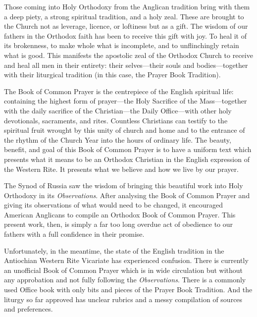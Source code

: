 {}
\noindent
Those coming into Holy Orthodoxy from the Anglican tradition bring with them a deep piety, a strong spiritual tradition, and a holy zeal. These are brought to the Church not as leverage, licence, or loftiness but as a gift. The wisdom of our fathers in the Orthodox faith has been to receive this gift with joy. To heal it of its brokenness, to make whole what is incomplete, and to unflinchingly retain what is good. This manifests the apostolic zeal of the Orthodox Church to receive and heal all men in their entirety: their selves---their souls and bodies---together with their liturgical tradition (in this case, the Prayer Book Tradition).\par
{}\par\noindent
The Book of Common Prayer is the centrepiece of the English spiritual life: containing the highest form of prayer---the Holy Sacrifice of the Mass---together with the daily sacrifice of the Christian---the Daily Office---with other holy devotionals, sacraments, and rites. Countless Christians can testify to the spiritual fruit wrought by this unity of church and home and to the entrance of the rhythm of the Church Year into the hours of ordinary life. The beauty, benefit, and goal of this Book of Common Prayer is to have a uniform text which presents what it means to be an Orthodox Christian in the English expression of the Western Rite. It presents what we believe and how we live by our prayer.\par
The Synod of Russia saw the wisdom of bringing this beautiful work into Holy Orthodoxy in its \textit{Observations}. After analysing the Book of Common Prayer and giving its observations of what would need to be changed, it encouraged American Anglicans to compile an Orthodox Book of Common Prayer. This present work, then, is simply a far too long overdue act of obedience to our fathers with a full confidence in their promise.\par
Unfortunately, in the meantime, the state of the English tradition in the Antiochian Western Rite Vicariate has experienced confusion. There is currently an unofficial Book of Common Prayer which is in wide circulation but without any approbation and not fully following the \textit{Observations}. There is a commonly used Office book with only bits and pieces of the Prayer Book Tradition. And the liturgy so far approved has unclear rubrics and a messy compilation of sources and preferences.\par
